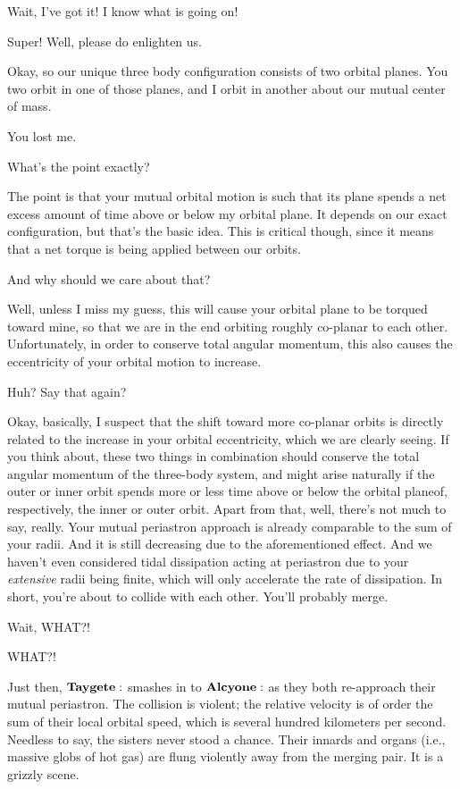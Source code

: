 \documentclass[main.tex]{subfiles}
\begin{document}
\Celaeno  Wait, I've got it!  I know what is going on!

\Taygete  Super!  Well, please do enlighten us.

\Celaeno  Okay, so our unique three body configuration consists of two orbital planes.  You two orbit in one of those planes, and I orbit in another about our mutual center of mass.

\Alcyone  You lost me.

\Taygete What's the point exactly?

\Celaeno The point is that your mutual orbital motion is such that its plane spends a net excess amount of time above or below my orbital plane.  It depends on our exact configuration, but that's the basic idea.  This is critical though, since it means that a net torque is being applied between our orbits.

\Alcyone And why should we care about that?

\Celaeno Well, unless I miss my guess, this will cause your orbital plane to be torqued toward mine, so that we are in the end orbiting roughly co-planar to each other.  Unfortunately, in order to conserve total angular momentum, this also causes the eccentricity of your orbital motion to increase.  

\Taygete  Huh?  Say that again?

\Celaeno Okay, basically, I suspect that the shift toward more co-planar orbits is directly related to the increase in your orbital eccentricity, which we are clearly seeing.  If you think about, these two things in combination should conserve the total angular momentum of the three-body system, and might arise naturally if the outer or inner orbit spends more or less time above or below the orbital planeof, respectively, the inner or outer orbit.  Apart from that, well, there's not much to say, really.  Your mutual periastron approach is already comparable to the sum of your radii.  And it is still decreasing due to the aforementioned effect.  And we haven't even considered tidal dissipation acting at periastron due to your \textit{extensive} radii being finite, which will only accelerate the rate of dissipation.  In short, you're about to collide with each other.  You'll probably merge.

\Taygete  Wait, WHAT?!

\Alcyone  WHAT?!

Just then, $\Taygete$ smashes in to $\Alcyone$ as they both re-approach their mutual periastron.  The collision is violent; the relative velocity is of order the sum of their local orbital speed, which is several hundred kilometers per second.  Needless to say, the sisters never stood a chance.  Their innards and organs (i.e., massive globs of hot gas) are flung violently away from the merging pair.  It is a grizzly scene.
\end{document}
